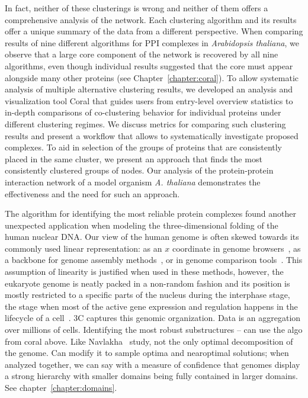 In fact, neither of these clusterings is wrong and neither of them offers a comprehensive analysis of the network. Each clustering algorithm and its results offer a unique summary of the data from a different perspective. When comparing results of nine different algorithms for PPI complexes in \textit{Arabidopsis thaliana}, we observe that a large core component of the network is recovered by all nine algorithms, even though individual results suggested that the core must appear alongside many other proteins (see Chapter~\ref{chapter:coral}). To allow systematic analysis of multiple alternative clustering results, we developed an analysis and visualization tool Coral that guides users from entry-level overview statistics to in-depth comparisons of co-clustering behavior for individual proteins under different clustering regimes. We discuss metrics for comparing such clustering results and present a workflow that allows to systematically investigate proposed complexes. To aid in selection of the groups of proteins that are consistently placed in the same cluster, we present an approach that finds the most consistently clustered groups of nodes. Our analysis of the protein-protein interaction network of a model organism \textit{A. thaliana} demonstrates the effectiveness and the need for such an approach.



The algorithm for identifying the most reliable protein complexes found another unexpected application when modeling the three-dimensional folding of the human nuclear DNA. Our view of the human genome is often skewed towards its commonly used linear representation: as an $x$ coordinate in genome browsers~\cite{GenomeBrowser}, as a backbone for genome assembly methods~\cite{RandomGenomeAssemblyMethod}, or in genome comparison tools~\cite{DotPlot}. This assumption of linearity is justified when used in these methods, however, the eukaryote genome is neatly packed in a non-random fashion and its position is mostly restricted to a specific parts of the nucleus during the interphase stage, the stage when most of the active gene expression and regulation happens in the lifecycle of a cell~\cite{GenomeOrganizationReview}. 
3C captures this genomic organization.
Data is an aggregation over millions of cells.
Identifying the most robust substructures -- can use the algo from coral above.
Like Navlakha~\cite{Navlakha10} study, not the only optimal decomposition of the genome. Can modify it to sample optima and nearoptimal solutions; when analyzed together, we can say with a measure of confidence that genomes display a strong hierarchy with smaller domains being fully contained in larger domains. See chapter~\ref{chapter:domains}.

